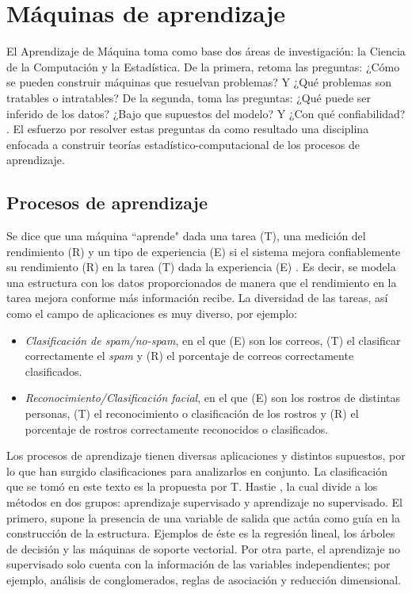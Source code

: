 \chapter{Máquinas de aprendizaje}
\label{ch:chapter1}

El Aprendizaje de Máquina toma como base dos áreas de investigación:
la Ciencia de la Computación y la Estadística. De la primera, retoma las preguntas: ¿Cómo se pueden construir máquinas que resuelvan problemas? Y ¿Qué problemas son tratables o intratables? De la segunda, toma las preguntas: ¿Qué puede ser inferido de los datos? ¿Bajo que supuestos del modelo? Y ¿Con qué confiabilidad? \cite{mitchell2006discipline}. El esfuerzo por resolver estas preguntas da como resultado una disciplina enfocada a construir teorías estadístico-computacional de los procesos de aprendizaje.

\section{Procesos de aprendizaje}

Se dice que una máquina ``aprende" dada una tarea (T), una medición del rendimiento (R) y un tipo de experiencia (E) si el sistema mejora confiablemente su rendimiento (R) en la tarea (T) dada la experiencia (E) \cite{mitchell2006discipline}. Es decir, se modela una estructura con los datos proporcionados de manera que el rendimiento en la tarea mejora conforme más información recibe. La diversidad de las tareas, así como el campo de aplicaciones es muy diverso, por ejemplo:

\begin{itemize} 

\item \textit{Clasificación de spam/no-spam}, en el que (E) son los correos, (T) el clasificar correctamente el \textit{spam} y (R) el porcentaje de correos correctamente clasificados.

\item \textit{Reconocimiento/Clasificación facial}, en el que (E) son los rostros de distintas personas, (T) el reconocimiento o clasificación de los rostros y (R) el porcentaje de rostros correctamente reconocidos o clasificados.

\end{itemize} 

Los procesos de aprendizaje tienen diversas aplicaciones y distintos supuestos, por lo que han surgido clasificaciones para analizarlos en conjunto. La clasificación que se tomó en este texto es la propuesta por T. Hastie \cite{hastie2009elements}, la cual divide a los métodos en dos grupos: aprendizaje supervisado y aprendizaje no supervisado. El primero, supone la presencia de una variable de salida que actúa como guía en la construcción de la estructura. Ejemplos de éste es la regresión lineal, los árboles de decisión y las máquinas de soporte vectorial. Por otra parte, el aprendizaje no supervisado solo cuenta con la información de las variables independientes; por ejemplo, análisis de conglomerados, reglas de asociación y reducción dimensional. 


